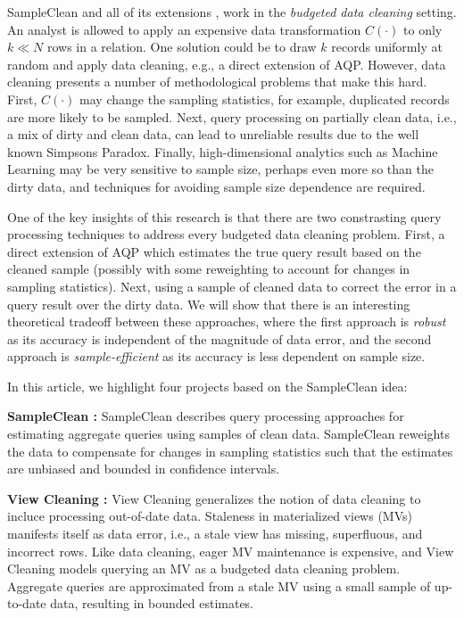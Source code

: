 SampleClean \cite{wang1999sample} and all of its extensions \cite{krishnan2015svc}, work in the \emph{budgeted data cleaning} setting. 
An analyst is allowed to apply an expensive data transformation $C(\cdot)$ to only $k\ll N$ rows in a relation.
One solution could be to draw $k$ records uniformly at random and apply data cleaning, e.g., a direct extension of AQP.
However, data cleaning presents a number of methodological problems that make this hard.
First, $C(\cdot)$ may change the sampling statistics, for example, duplicated records are more likely to be sampled.
Next, query processing on partially clean data, i.e., a mix of dirty and clean data, can lead to unreliable results due to the well known Simpsons Paradox.
Finally, high-dimensional analytics such as Machine Learning may be very sensitive to sample size, perhaps even more so than the dirty data, and techniques for avoiding sample size dependence are required.

One of the key insights of this research is that there are two constrasting query processing techniques to address every budgeted data cleaning problem.
First, a direct extension of AQP which estimates the true query result based on the cleaned sample (possibly with some reweighting to account for changes in sampling statistics). 
Next, using a sample of cleaned data to correct the error in a query result over the dirty data.
We will show that there is an interesting theoretical tradeoff between these approaches, where the first approach is \emph{robust} as its accuracy is independent of the magnitude of data error, and the second approach is \emph{sample-efficient} as its accuracy is less dependent on sample size.

In this article, we highlight four projects based on the SampleClean idea:

\vspace{0.5em}
\noindent \textbf{SampleClean \cite{wang1999sample}: } SampleClean describes query processing approaches for estimating aggregate queries using samples of clean data. SampleClean reweights the data to compensate for changes in sampling statistics such that the estimates are unbiased and bounded in confidence intervals.

\vspace{0.5em}
\noindent \textbf{View Cleaning \cite{krishnan2015svc}: } View Cleaning generalizes the notion of data cleaning to incluce processing out-of-date data. Staleness in materialized views (MVs) manifests itself as data error, i.e., a stale view has missing, superfluous, and incorrect rows.
Like data cleaning, eager MV maintenance is expensive, and View Cleaning models querying an MV as a budgeted data cleaning problem.
Aggregate queries are approximated from a stale MV using a small sample of up-to-date data, resulting in bounded estimates.

